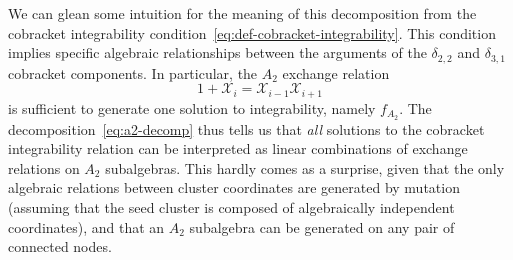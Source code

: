 \documentclass[12pt]{article}
\def\x{\mathcal{X}}
\begin{document}
We can glean some intuition for the meaning of this decomposition from the cobracket integrability condition~\eqref{eq:def-cobracket-integrability}. This condition implies specific algebraic relationships between the arguments of the $\delta_{2,2}$ and $\delta_{3,1}$ cobracket components. In particular, the $A_2$ exchange relation
\begin{equation}
	1+\x_i = \x_{i-1}\x_{i+1}
\end{equation}
is sufficient to generate one solution to integrability, namely $f_{A_2}$. The decomposition~\eqref{eq:a2-decomp} thus tells us that \emph{all} solutions to the cobracket integrability relation can be interpreted as linear combinations of exchange relations on $A_2$ subalgebras. This hardly comes as a surprise, given that the only algebraic relations between cluster coordinates are generated by mutation (assuming that the seed cluster is composed of algebraically independent coordinates), and that an $A_2$ subalgebra can be generated on any pair of connected nodes.


\end{document}
